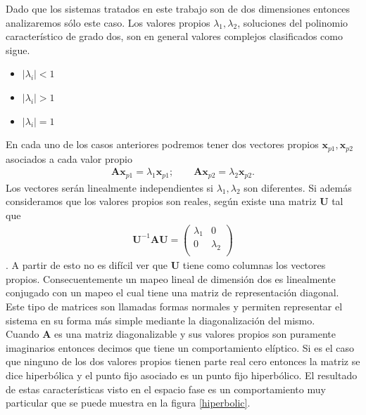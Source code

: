 Dado que los sistemas tratados en este trabajo son de dos dimensiones entonces analizaremos sólo este caso. Los valores propios $\lambda_{1}, \lambda_{2}$, soluciones del polinomio característico de grado dos, son en general valores complejos clasificados como sigue.
\begin{itemize}
\item $\vert \lambda_{i}\vert<1$
\item $\vert \lambda_{i}\vert>1$
\item $\vert \lambda_{i}\vert=1$
\end{itemize}
En cada uno de los casos anteriores podremos tener dos vectores propios $\pmb x_{p1}, \pmb x_{p2}$ asociados a cada valor propio
\begin{eqnarray}
\mathbf{A}\pmb x_{p1}=\lambda_{1}\pmb x_{p1} ;\qquad \mathbf{A}\pmb x_{p2}=\lambda_{2}\pmb x_{p2}.
\end{eqnarray}
Los vectores serán linealmente independientes si $\lambda_{1},\lambda_{2}$ son diferentes. Si además consideramos que los valores propios son reales, según \cite{Friedberg} existe una matriz $\mathbf{U}$ tal que 
\begin{eqnarray}
\mathbf{U}^{-1}\mathbf{A}\mathbf{U} = \begin{pmatrix}
\lambda_{1} & 0\\
0 & \lambda_{2}\\
\end{pmatrix}
\end{eqnarray}.
A partir de esto no es difícil ver que $\mathbf{U}$ tiene como columnas los vectores propios. Consecuentemente un mapeo lineal de dimensión dos es linealmente conjugado con un mapeo el cual tiene una matriz de representación diagonal. Este tipo de matrices son llamadas formas normales y
permiten representar el sistema en su forma más simple mediante la diagonalización del mismo.\\

Cuando $\mathbf{A}$ es una matriz diagonalizable y sus valores propios son puramente imaginarios entonces decimos que tiene un comportamiento elíptico. Si es el caso que ninguno de los dos valores propios tienen parte real cero entonces la matriz se dice hiperbólica y el punto fijo asociado es un punto fijo hiperbólico. El resultado de estas características visto en el espacio fase es un comportamiento muy particular que se puede muestra en la figura \ref{hiperbolic}. \\

